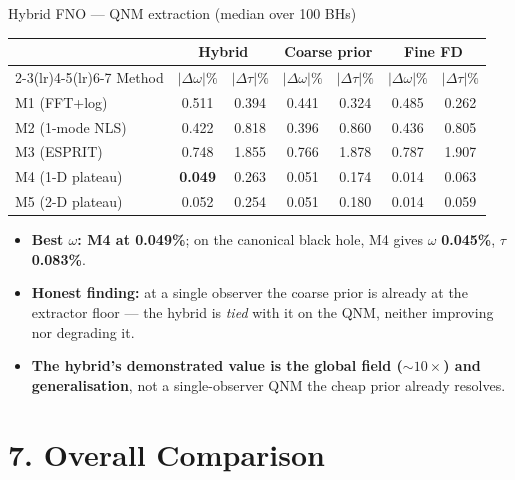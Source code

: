 \documentclass[aspectratio=169, 11pt]{beamer}
\newcommand{\bh}{black hole}
\newcommand{\qnm}{QNM}
\begin{document}
\begin{frame}{Hybrid FNO --- QNM extraction (median over 100 BHs)}
  \begin{center}\footnotesize
    \begin{tabular}{@{}lcccccc@{}}
      \toprule
       & \multicolumn{2}{c}{\textbf{Hybrid}} & \multicolumn{2}{c}{Coarse prior} & \multicolumn{2}{c}{Fine FD} \\
      \cmidrule(lr){2-3}\cmidrule(lr){4-5}\cmidrule(lr){6-7}
      Method & $|\Delta\omega|\%$ & $|\Delta\tau|\%$ & $|\Delta\omega|\%$ & $|\Delta\tau|\%$ & $|\Delta\omega|\%$ & $|\Delta\tau|\%$ \\
      \midrule
      M1 (FFT+log) & 0.511 & 0.394 & 0.441 & 0.324 & 0.485 & 0.262 \\
      M2 (1-mode NLS) & 0.422 & 0.818 & 0.396 & 0.860 & 0.436 & 0.805 \\
      M3 (ESPRIT) & 0.748 & 1.855 & 0.766 & 1.878 & 0.787 & 1.907 \\
      \rowcolor{green!10}
      M4 (1-D plateau) & \textbf{0.049} & 0.263 & 0.051 & 0.174 & 0.014 & 0.063 \\
      M5 (2-D plateau) & 0.052 & 0.254 & 0.051 & 0.180 & 0.014 & 0.059 \\
      \bottomrule
    \end{tabular}
  \end{center}
  \medskip
  \begin{itemize}\small
    \item \textbf{Best $\omega$: M4 at 0.049\%}; on the canonical \bh{}, M4 gives
          $\omega$ \textbf{0.045\%}, $\tau$ \textbf{0.083\%}.
    \item \textbf{Honest finding:} at a single observer the coarse prior is already at the
          extractor floor --- the hybrid is \emph{tied} with it on the \qnm{}, neither
          improving nor degrading it.
    \item \textbf{The hybrid's demonstrated value is the global field ($\sim\!10\times$)
          and generalisation}, not a single-observer \qnm{} the cheap prior already resolves.
  \end{itemize}
\end{frame}


\section{7. Overall Comparison}
\end{document}
